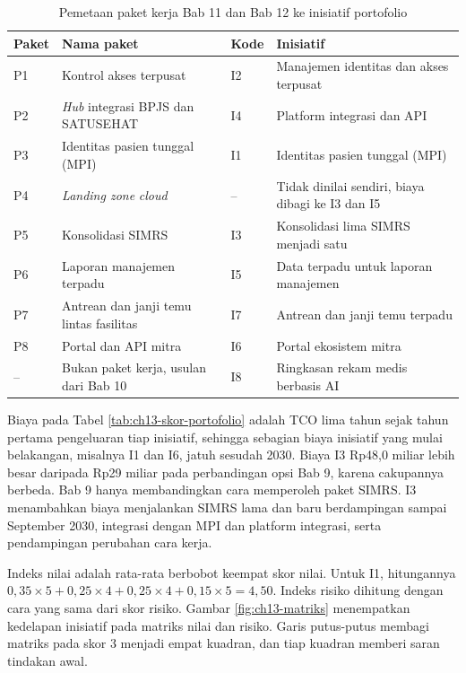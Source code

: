 \begin{table}[!htb]
  \centering
  \caption{Pemetaan paket kerja Bab 11 dan Bab 12 ke inisiatif portofolio}
  \label{tab:ch13-peta-paket}
  \footnotesize
  \begin{tabularx}{\textwidth}{l>{\raggedright\arraybackslash}Xl>{\raggedright\arraybackslash}X}
    \hline
    \textbf{Paket} & \textbf{Nama paket} & \textbf{Kode} & \textbf{Inisiatif} \\
    \hline
    P1 & Kontrol akses terpusat & I2 & Manajemen identitas dan akses terpusat \\
    \hline
    P2 & \textit{Hub} integrasi BPJS dan SATUSEHAT & I4 & Platform integrasi dan API \\
    \hline
    P3 & Identitas pasien tunggal (MPI) & I1 & Identitas pasien tunggal (MPI) \\
    \hline
    P4 & \textit{Landing zone} \textit{cloud} & -- & Tidak dinilai sendiri, biaya dibagi ke
      I3 dan I5 \\
    \hline
    P5 & Konsolidasi SIMRS & I3 & Konsolidasi lima SIMRS menjadi satu \\
    \hline
    P6 & Laporan manajemen terpadu & I5 & Data terpadu untuk laporan manajemen \\
    \hline
    P7 & Antrean dan janji temu lintas fasilitas & I7 & Antrean dan janji temu terpadu \\
    \hline
    P8 & Portal dan API mitra & I6 & Portal ekosistem mitra \\
    \hline
    -- & Bukan paket kerja, usulan dari Bab 10 & I8 & Ringkasan rekam medis berbasis AI \\
    \hline
  \end{tabularx}
\end{table}

Biaya pada Tabel \ref{tab:ch13-skor-portofolio} adalah TCO lima tahun sejak tahun
pertama pengeluaran tiap inisiatif, sehingga sebagian biaya inisiatif yang mulai
belakangan, misalnya I1 dan I6, jatuh sesudah 2030. Biaya I3 Rp48,0 miliar lebih
besar daripada Rp29 miliar pada perbandingan opsi Bab 9, karena cakupannya berbeda.
Bab 9 hanya membandingkan cara memperoleh paket SIMRS. I3 menambahkan biaya
menjalankan SIMRS lama dan baru berdampingan sampai September 2030, integrasi
dengan MPI dan platform integrasi, serta pendampingan perubahan cara kerja.

Indeks nilai adalah rata-rata berbobot keempat skor nilai. Untuk I1,
hitungannya $0{,}35 \times 5 + 0{,}25 \times 4 + 0{,}25 \times 4 + 0{,}15
\times 5 = 4{,}50$. Indeks risiko dihitung dengan cara yang sama dari skor
risiko. Gambar \ref{fig:ch13-matriks} menempatkan kedelapan inisiatif pada
matriks nilai dan risiko. Garis putus-putus membagi matriks pada skor 3
menjadi empat kuadran, dan tiap kuadran memberi saran tindakan awal.

